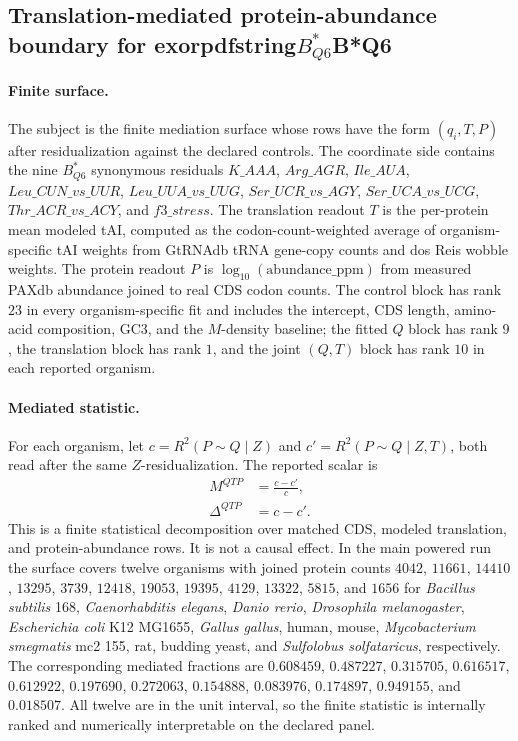 \subsection{Translation-mediated protein-abundance boundary for  exorpdfstring{$B^*_{Q6}$}{B*Q6}}
\label{sec:q6-translation-mediated-protein-abundance-cross-layer}

\paragraph{Finite surface.}
The subject is the finite mediation surface whose rows have the form $(q_i,T,P)$ after residualization against the declared controls.  The coordinate side contains the nine $B^*_{Q6}$ synonymous residuals
$K\_AAA$, $Arg\_AGR$, $Ile\_AUA$, $Leu\_CUN\_vs\_UUR$, $Leu\_UUA\_vs\_UUG$, $Ser\_UCR\_vs\_AGY$, $Ser\_UCA\_vs\_UCG$, $Thr\_ACR\_vs\_ACY$, and $f3\_stress$.  The translation readout $T$ is the per-protein mean modeled tAI, computed as the codon-count-weighted average of organism-specific tAI weights from GtRNAdb tRNA gene-copy counts and dos Reis wobble weights.  The protein readout $P$ is $\log_{10}(\mathrm{abundance\_ppm})$ from measured PAXdb abundance joined to real CDS codon counts.  The control block has rank $23$ in every organism-specific fit and includes the intercept, CDS length, amino-acid composition, GC3, and the $M$-density baseline; the fitted $Q$ block has rank $9$, the translation block has rank $1$, and the joint $(Q,T)$ block has rank $10$ in each reported organism.

\paragraph{Mediated statistic.}
For each organism, let $c=R^2(P\sim Q\mid Z)$ and $c'=R^2(P\sim Q\mid Z,T)$, both read after the same $Z$-residualization.  The reported scalar is
$$
\begin{aligned}
M^{QTP} &= \frac{c-c'}{c},\\
\Delta^{QTP} &= c-c'.
\end{aligned}
$$
This is a finite statistical decomposition over matched CDS, modeled translation, and protein-abundance rows.  It is not a causal effect.  In the main powered run the surface covers twelve organisms with joined protein counts $4042$, $11661$, $14410$, $13295$, $3739$, $12418$, $19053$, $19395$, $4129$, $13322$, $5815$, and $1656$ for \emph{Bacillus subtilis} 168, \emph{Caenorhabditis elegans}, \emph{Danio rerio}, \emph{Drosophila melanogaster}, \emph{Escherichia coli} K12 MG1655, \emph{Gallus gallus}, human, mouse, \emph{Mycobacterium smegmatis} mc2 155, rat, budding yeast, and \emph{Sulfolobus solfataricus}, respectively.  The corresponding mediated fractions are $0.608459$, $0.487227$, $0.315705$, $0.616517$, $0.612922$, $0.197690$, $0.272063$, $0.154888$, $0.083976$, $0.174897$, $0.949155$, and $0.018507$.  All twelve are in the unit interval, so the finite statistic is internally ranked and numerically interpretable on the declared panel.

